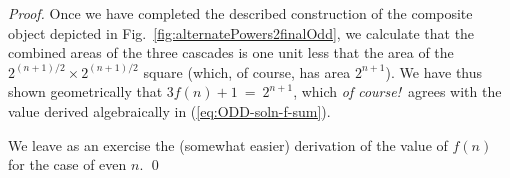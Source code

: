 \begin{proof}
Once we have completed the described construction of the composite
object depicted in Fig.~\ref{fig:alternatePowers2finalOdd}, we
calculate that the combined areas of the three cascades is one unit
less that the area of the $2^{(n+1)/2} \times 2^{(n+1)/2}$ square
(which, of course, has area $2^{n+1}$).  We have thus shown
geometrically that $3 f(n)+1 \ = \ 2^{n+1}$, which {\em of
  course!}~agrees with the value derived algebraically in
(\ref{eq:ODD-soln-f-sum}).

\bigskip

We leave as an exercise the (somewhat easier) derivation of the value
of $f(n)$ for the case of even $n$.
\qed
\end{proof}


%
%
%
%
%
%


